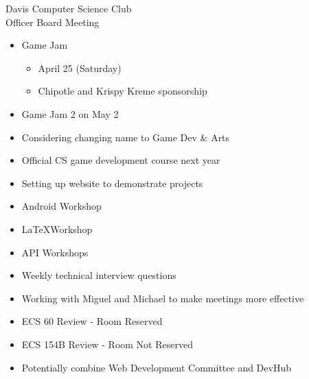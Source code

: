 \documentclass{article}
\begin{document}
\begin{Minutes}{Davis Computer Science Club\\Officer Board Meeting}
\begin{itemize}
	\item Game Jam
	\begin{itemize}
		\item April 25 (Saturday)
		\item Chipotle and Krispy Kreme sponsorship
	\end{itemize}
	\item Game Jam 2 on May 2
	\item Considering changing name to Game Dev \& Arts
	\item Official CS game development course next year
	\item Setting up website to demonstrate projects
\end{itemize}


\begin{itemize}
	\item Android Workshop
	\item \LaTeX Workshop
	\item API Workshops
\end{itemize}


\begin{itemize}
	\item Weekly technical interview questions
	\item Working with Miguel and Michael to make meetings more effective
\end{itemize}


\begin{itemize}
	\item ECS 60 Review - Room Reserved
	\item ECS 154B Review - Room Not Reserved
\end{itemize}


\begin{itemize}
	\item Potentially combine Web Development Committee and DevHub
\end{itemize}



\end{Minutes}
\end{document}

